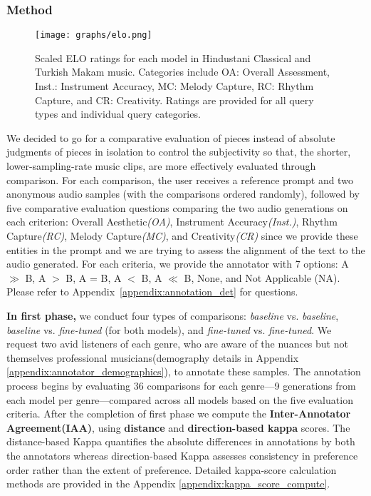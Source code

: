 \subsubsection{Method}

\begin{figure*}[!t]
    \centering
    \texttt{[image: graphs/elo.png]} %
    \caption{Scaled ELO ratings for each model in Hindustani Classical and Turkish Makam music. Categories include OA: Overall Assessment, Inst.: Instrument Accuracy, MC: Melody Capture, RC: Rhythm Capture, and CR: Creativity. Ratings are provided for all query types and individual query categories.}
    \label{fig:results_evaluation}
\end{figure*}

We decided to go for a comparative evaluation of pieces instead of absolute judgments of pieces in isolation to control the subjectivity so that, the shorter, lower-sampling-rate music clips, are more effectively evaluated through comparison. For each comparison, the user receives a reference prompt and two anonymous audio samples (with the comparisons ordered randomly), followed by five comparative evaluation questions comparing the two audio generations on each criterion: Overall Aesthetic\textit{(OA)}, Instrument Accuracy\textit{(Inst.)}, Rhythm Capture\textit{(RC)}, Melody Capture\textit{(MC)}, and Creativity\textit{(CR)} since we provide these entities in the prompt and we are trying to assess the alignment of the text to the audio generated. For each criteria, we provide the annotator with 7 options: A $\gg$ B, A $>$ B, A = B, A $<$ B, A $\ll$ B, None, and Not Applicable (NA). Please refer to Appendix~\ref{appendix:annotation_det} for questions.

\textbf{In first phase,} we conduct four types of comparisons: \textit{baseline} vs. \textit{baseline},\textit{ baseline }vs.\textit{ fine-tuned} (for both models), and \textit{fine-tuned} vs. \textit{fine-tuned}. We request two avid listeners of each genre, who are aware of the nuances but not themselves professional musicians(demography details in Appendix \ref{appendix:annotator_demographics}), to annotate these samples. The annotation process begins by evaluating 36 comparisons for each genre—9 generations from each model per genre—compared across all models based on the five evaluation criteria. After the completion of first phase we compute the \textbf{Inter-Annotator Agreement(IAA)}, using \textbf{distance} and \textbf{direction-based kappa} scores. The distance-based Kappa quantifies the absolute differences in annotations by both the annotators whereas direction-based Kappa assesses consistency in preference order rather than the extent of preference. Detailed kappa-score calculation methods are provided in the Appendix \ref{appendix:kappa_score_compute}. 

